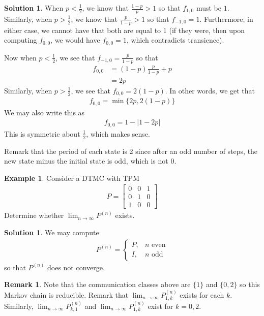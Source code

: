 \documentclass[11pt]{amsart}
\theoremstyle{definition}
\newtheorem{remark}[theorem]{Remark}
\newtheorem{example}[theorem]{Example}
\newtheorem{solution}[theorem]{Solution}
\numberwithin{equation}{section}
\begin{document}
\begin{solution}
     When $p<\frac{1}{2}$, we know that $\frac{1-p}{p}>1$ so that $f_{1,0}$ must be $1$. Similarly, when $p>\frac{1}{2}$, we know that $\frac{p}{1-p}>1$ so that $f_{-1,0}=1$. Furthermore, in either case, we cannot have that both are equal to 1 (if they were, then upon computing $f_{0,0}$, we would have $f_{0,0}=1$, which contradicts transience).

     Now when $p<\frac{1}{2}$, we see that $f_{-1,0}=\frac{p}{1-p}$ so that
     \begin{align*}
         f_{0,0}&=(1-p)\frac{p}{1-p}+p\\
         &=2p
     \end{align*}
     Similarly, when $p>\frac{1}{2}$, we see that $f_{0,0}=2(1-p)$. In other words, we get that
     \begin{align*}
         f_{0,0}=\min\{2p,2(1-p)\}
     \end{align*}
     We may also write this as
     \begin{align*}
         f_{0,0}=1-|1-2p|
     \end{align*}
     This is symmetric about $\frac{1}{2}$, which makes sense.
     
     Remark that the period of each state is 2 since after an odd number of steps, the new state minus the initial state is odd, which is not 0.
 \end{solution}
 \begin{example}
     Consider a DTMC with TPM
     \begin{align*}
         P=\begin{bmatrix}
             0 & 0 & 1\\
             0 & 1 & 0\\
             1 & 0 & 0
         \end{bmatrix}
     \end{align*}
     Determine whether $\lim_{n\to\infty}P^{(n)}$ exists.
 \end{example}
 \addtocounter{theorem}{-1}
 \begin{solution}
     We may compute
     \begin{align*}
         P^{(n)}=\begin{cases}
             P, & n\text{ even}\\
             I, & n\text{ odd}
         \end{cases}
     \end{align*}
     so that $P^{(n)}$ does not converge.
 \end{solution}
 \begin{remark}
     Note that the communication classes above are $\{1\}$ and $\{0,2\}$ so this Markov chain is reducible. Remark that $\lim_{n\to\infty}P^{(n)}_{1,k}$ exists for each $k$. Similarly, $\lim_{n\to\infty} P_{k,1}^{(n)}$ and $\lim_{n\to\infty}P_{1,k}^{(n)}$ exist for $k=0,2$.
 \end{remark}
\end{document}
